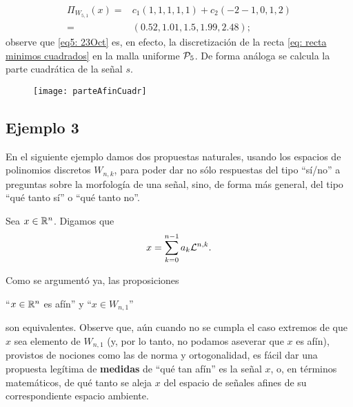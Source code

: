 {\begin{align}
\label{eq5: 23Oct}
\Pi_{W_{5,1}}(x) =& c_{1} (1,1,1,1,1) + c_{2}(-2-1,0,1,2) \nonumber \\
= & (0.52, 1.01, 1.5, 1.99, 2.48 );
\end{align}
observe que \eqref{eq5: 23Oct} es, 
en efecto, la discretización de 
la recta \eqref{eq: recta minimos cuadrados}
en la malla uniforme $\mathcal{P}_{5}$.
De forma análoga se calcula la parte cuadrática de
la señal $s$.

\begin{figure}[H]
	\centering
	\texttt{[image: parteAfinCuadr]}
\end{figure}	
\final





\subsection{Ejemplo 3}
\label{subs: ejm 3}

En el siguiente ejemplo 
damos dos propuestas naturales,
usando los espacios de polinomios discretos $W_{n,k}$,
para poder dar no sólo respuestas del tipo
``sí/no'' a preguntas sobre la morfología de una señal, sino,
de forma más general, del tipo ``qué tanto sí'' o
``qué tanto no''.




Sea $x \in \mathbb{R}^{n}$. Digamos que 
\[
x = \sum\limits_{k=0}^{n-1}a_{k} \mathcal{L}^{n, k}.
\]


Como se argumentó ya, las proposiciones
\begin{center}
``$x \in \mathbb{R}^{n}$ es afín'' \hspace{0.2cm} y \hspace{0.2cm} 
``$x \in W_{n,1}$''
\end{center} 
son equivalentes.
Observe que, aún cuando no se cumpla el caso
extremos de que $x$ sea elemento 
de $W_{n,1}$ (y, por lo tanto, no podamos aseverar que
$x$ es afín), provistos
de nociones como las de norma y ortogonalidad, es fácil dar 
una propuesta legítima de
\textbf{medidas} de ``qué tan afín'' es la señal $x$,
o, en términos matemáticos, de qué tanto se aleja
$x$ del espacio de señales afines de su correspondiente
espacio ambiente.

}
